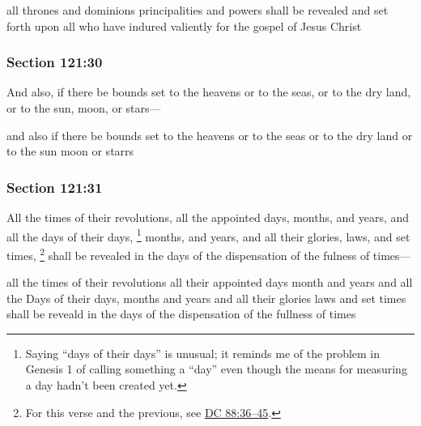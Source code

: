 		\begin{framed}
		\scriptsize
			\begin{compactdesc}
				\item[JSP] all thrones and dominions principalities and powers shall be revealed and set forth upon all who have indured valiently for the gospel of Jesus Christ
			\end{compactdesc}
		\end{framed}

	\subsubsection{Section 121:30} %
		\label{DC121-30}

		And also, if there be bounds set to the heavens or to the seas, or to the dry land, or to the sun, moon, or stars---

		\begin{framed}
		\scriptsize
			\begin{compactdesc}
				\item[JSP] and also if there be bounds set to the heavens or to the seas or to the dry land or to the sun moon or starrs
			\end{compactdesc}
		\end{framed}

	\subsubsection{Section 121:31} %
		\label{DC121-31}

		All the times of their revolutions, all the appointed days, months, and years, and all the days of their days,%
			\footnote{%
				Saying ``days of their days'' is unusual; it reminds me of the problem in Genesis 1 of calling something a ``day'' even though the means for measuring a day hadn't been created yet.
				}
		months, and years, and all their glories, laws, and set times,%
			\footnote{%
				For this verse and the previous, see \hyperref[DC88-36]{DC 88:36--45}.
				}
		shall be revealed in the days of the dispensation of the fulness of times---

		\begin{framed}
		\scriptsize
			\begin{compactdesc}
				\item[JSP] all the times of their revolutions all their appointed days month and years and all the Days of their days, months and years and all their glories laws and set times shall be reveald in the days of the dispensation of the fullness of times
			\end{compactdesc}
		\end{framed}

